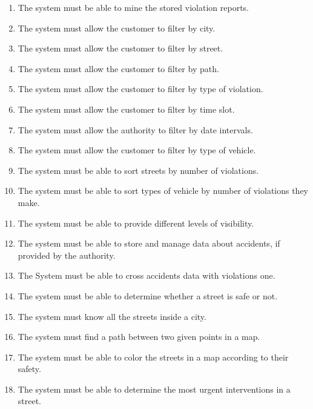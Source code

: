 \begin{enumerate}[label=\textbf{R\arabic*}]
			\item \label{req:mineData} The system must be able to mine the stored violation reports.
			\item \label{req:cityFilter} The system must allow the customer to filter by city.
			\item \label{req:streetFilter} The system must allow the customer to filter by street.
			\item \label{req:pathFilter} The system must allow the customer to filter by path.
			\item \label{req:violationFilter} The system must allow the customer to filter by type of violation.
			\item \label{req:timeFilter} The system must allow the customer to filter by time slot.
			\item \label{req:dateFilter} The system must allow the authority to filter by date intervals.
			\item \label{req:vehicleFilter} The system must allow the customer to filter by type of vehicle.
			\item \label{req:sortedResult} The system must be able to sort streets by number of violations.
			\item \label{req:sortedVehicles} The system must be able to sort types of vehicle by number of violations they make.
			\item \label{req:visibility} The system must be able to provide different levels of visibility.
			\item \label{req:accidentsData} The system must be able to store and manage data about accidents, if provided by the authority.
			\item \label{req:crossData} The System must be able to cross accidents data with violations one.
			\item \label{req:safeStreet} The system must be able to determine whether a street is safe or not.
			\item \label{req:cityStreets} The system must know all the streets inside a city.
			\item \label{req:pathFinder} The system must find a path between two given points in a map.
			\item \label{req:colorMap} The system must be able to color the streets in a map according to their safety.
			\item \label{req:interventions} The system must be able to determine the most urgent interventions in a street.	
		\end{enumerate}
	
